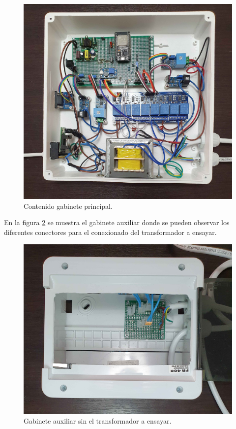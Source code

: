 \begin{figure}[h]
	\centering
	\includegraphics[scale=0.15]{./Figures/gab3.jpg}
	\caption{Contenido gabinete principal.}
	\label{fig:gab3}
\end{figure}

\pagebreak

En la figura \ref{fig:gab4} se muestra el gabinete auxiliar donde se pueden observar los diferentes conectores para el conexionado del transformador a ensayar.

\begin{figure}[hb]
	\centering
	\includegraphics[scale=0.08]{./Figures/gab4.jpg}
	\caption{Gabinete auxiliar sin el transformador a ensayar.}
	\label{fig:gab4}
\end{figure}


